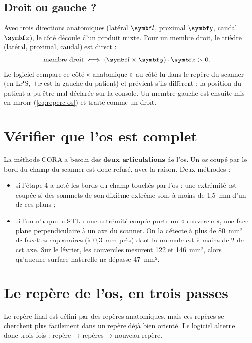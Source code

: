 \subsection{Droit ou gauche ?}

Avec trois directions anatomiques (latéral $\vb{l}$, proximal $\vb{y}$, caudal $\vb{z}$), le côté découle d'un
produit mixte. Pour un membre droit, le trièdre (latéral, proximal, caudal) est direct :
\begin{equation}
  \text{membre droit} \iff (\vb{l} \times \vb{y}) \cdot \vb{z} > 0.
\end{equation}
Le logiciel compare ce côté « anatomique » au côté lu dans le repère du scanner (en LPS, $+x$ est la gauche du
patient) et prévient s'ils diffèrent : la position du patient a pu être mal déclarée sur la console. Un membre gauche
est ensuite mis en miroir (\cref{eq:repere-os}) et traité comme un droit.

\section{Vérifier que l'os est complet}
\label{sec:completude}

La méthode CORA a besoin des \textbf{deux articulations} de l'os. Un os coupé par le bord du champ du scanner est donc
refusé, avec la raison. Deux méthodes :
\begin{itemize}
  \item si l'étape 4 a noté les bords du champ touchés par l'os : une extrémité est coupée si des sommets de son
  dixième extrême sont à moins de 1,5~mm d'un de ces plans ;
  \item si l'on n'a que le STL : une extrémité coupée porte un « couvercle », une face plane perpendiculaire à un axe du
  scanner. On la détecte à plus de 80~mm² de facettes coplanaires (à 0,3~mm près) dont la normale est à moins de
  2\degre{} de cet axe. Sur le lévrier, les couvercles mesurent 122 et 146~mm², alors qu'aucune surface naturelle ne
  dépasse 47~mm².
\end{itemize}

\section{Le repère de l'os, en trois passes}
\label{sec:repere-construction}

Le repère final est défini par des repères anatomiques, mais ces repères se cherchent plus facilement dans un repère
déjà bien orienté. Le logiciel alterne donc trois fois : repère → repères → nouveau repère.

